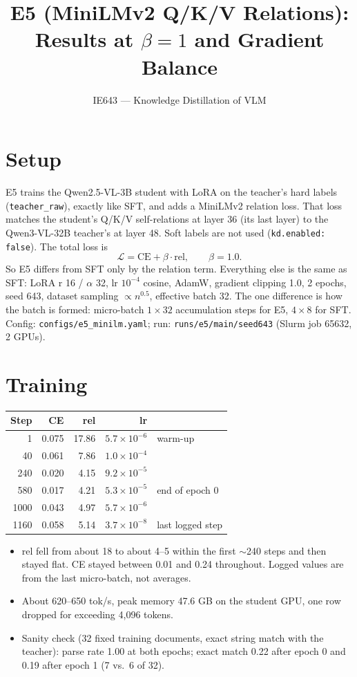 \documentclass[10pt]{article}
\title{E5 (MiniLMv2 Q/K/V Relations): Results at $\beta = 1$ and Gradient Balance}
\author{IE643 --- Knowledge Distillation of VLM}
\date{}
\newcommand{\code}[1]{\texttt{#1}}
\begin{document}
\maketitle
\vspace{-1.5em}

\section{Setup}

E5 trains the Qwen2.5-VL-3B student with LoRA on the teacher's hard labels (\code{teacher\_raw}), exactly like SFT, and adds a MiniLMv2 relation loss. That loss matches the student's Q/K/V self-relations at layer 36 (its last layer) to the Qwen3-VL-32B teacher's at layer 48. Soft labels are not used (\code{kd.enabled: false}). The total loss is
\[
  \mathcal{L} = \mathrm{CE} + \beta \cdot \mathrm{rel}, \qquad \beta = 1.0 .
\]
So E5 differs from SFT only by the relation term. Everything else is the same as SFT: LoRA r 16 / $\alpha$ 32, lr $10^{-4}$ cosine, AdamW, gradient clipping 1.0, 2 epochs, seed 643, dataset sampling $\propto n^{0.5}$, effective batch 32. The one difference is how the batch is formed: micro-batch $1 \times 32$ accumulation steps for E5, $4 \times 8$ for SFT. Config: \code{configs/e5\_minilm.yaml}; run: \code{runs/e5/main/seed643} (Slurm job 65632, 2 GPUs).

\section{Training}

\begin{center}
\begin{tabular}{rrrrl}
\toprule
Step & CE & rel & lr & \\
\midrule
1 & 0.075 & 17.86 & $5.7\times10^{-6}$ & warm-up \\
40 & 0.061 & 7.86 & $1.0\times10^{-4}$ & \\
240 & 0.020 & 4.15 & $9.2\times10^{-5}$ & \\
580 & 0.017 & 4.21 & $5.3\times10^{-5}$ & end of epoch 0 \\
1000 & 0.043 & 4.97 & $5.7\times10^{-6}$ & \\
1160 & 0.058 & 5.14 & $3.7\times10^{-8}$ & last logged step \\
\bottomrule
\end{tabular}
\end{center}

\begin{itemize}
  \item rel fell from about 18 to about 4--5 within the first $\sim$240 steps and then stayed flat. CE stayed between 0.01 and 0.24 throughout. Logged values are from the last micro-batch, not averages.
  \item About 620--650 tok/s, peak memory 47.6 GB on the student GPU, one row dropped for exceeding 4{,}096 tokens.
  \item Sanity check (32 fixed training documents, exact string match with the teacher): parse rate 1.00 at both epochs; exact match 0.22 after epoch 0 and 0.19 after epoch 1 (7 vs.\ 6 of 32).
\end{itemize}
\end{document}
